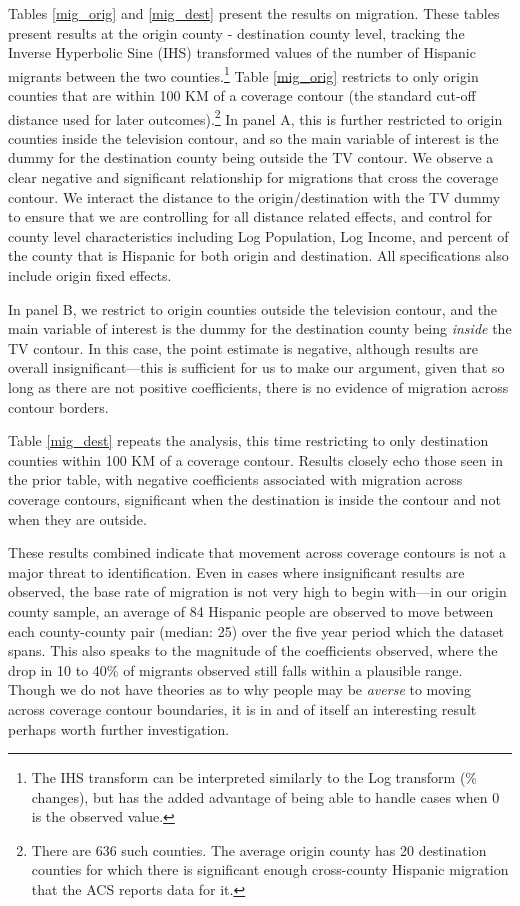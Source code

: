 \documentclass[11pt]{article}
\begin{document}
Tables \ref{mig_orig} and \ref{mig_dest} present the results on migration. These tables present results at the origin county - destination county level, tracking the Inverse Hyperbolic Sine (IHS) transformed values of the number of Hispanic migrants between the two counties.\footnote{ The IHS transform can be interpreted similarly to the Log transform (\% changes), but has the added advantage of being able to handle cases when $0$ is the observed value.} Table \ref{mig_orig} restricts to only origin counties that are within 100 KM of a coverage contour (the standard cut-off distance used for later outcomes).\footnote{ There are 636 such counties. The average origin county has 20 destination counties for which there is significant enough cross-county Hispanic migration that the ACS reports data for it.} In panel A, this is further restricted to origin counties inside the television contour, and so the main variable of interest is the dummy for the destination county being outside the TV contour. We observe a clear negative and significant relationship for migrations that cross the coverage contour. We interact the distance to the origin/destination with the TV dummy to ensure that we are controlling for all distance related effects, and control for county level characteristics including Log Population, Log Income, and percent of the county that is Hispanic for both origin and destination. All specifications also include origin fixed effects.

In panel B, we restrict to origin counties outside the television contour, and the main variable of interest is the dummy for the destination county being \textit{inside} the TV contour. In this case, the point estimate is negative, although results are overall insignificant---this is sufficient for us to make our argument, given that so long as there are not positive coefficients, there is no evidence of migration across contour borders.

Table \ref{mig_dest} repeats the analysis, this time restricting to only destination counties within 100 KM of a coverage contour. Results closely echo those seen in the prior table, with negative coefficients associated with migration across coverage contours, significant when the destination is inside the contour and not when they are outside. 

These results combined indicate that movement across coverage contours is not a major threat to identification. Even in cases where insignificant results are observed, the base rate of migration is not very high to begin with---in our origin county sample, an average of 84 Hispanic people are observed to move between each county-county pair (median: 25) over the five year period which the dataset spans. This also speaks to the magnitude of the coefficients observed, where the drop in 10 to 40\% of migrants observed still falls within a plausible range. Though we do not have theories as to why people may be \textit{averse} to moving across coverage contour boundaries, it is in and of itself an interesting result perhaps worth further investigation.
\end{document}
